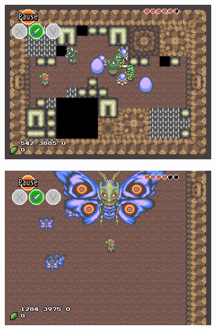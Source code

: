 \documentclass[a4paper]{article}
\begin{document}
\begin{multicols*}{2}
\begin{figure}[t]
\begin{subfigure}[b]{0.45\textwidth}
\end{subfigure} \hfill
\begin{subfigure}[b]{0.45\textwidth}
  \includegraphics[width=\textwidth]{dungeonroom}
\end{subfigure} \hfill
\begin{subfigure}[b]{0.45\textwidth}
  \includegraphics[width=\textwidth]{bossroom}
\end{subfigure} \hfill
\end{figure}


\end{multicols*}
\end{document}
